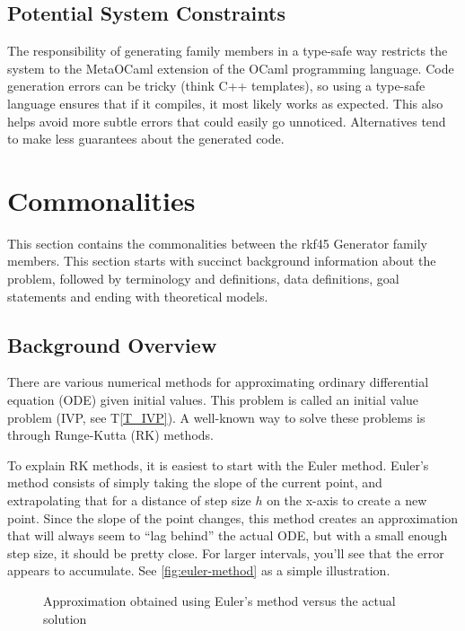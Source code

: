 \documentclass[12pt]{article}
\newcommand{\tref}[1]{T\ref{#1}}
\newcommand{\famname}{rkf45 Generator} %
\begin{document}
                          
\subsection{Potential System Constraints}

The responsibility of generating family members in a type-safe way restricts 
the system to the MetaOCaml extension of the OCaml programming language.
Code generation errors can be tricky (think C++ templates), so using a 
type-safe language ensures that if it compiles, it most likely works as 
expected.
This also helps avoid more subtle errors that could easily go unnoticed.
Alternatives tend to make less guarantees about the generated code.
\section{Commonalities}

This section contains the commonalities between the \famname{} family members. 
This section starts with succinct background information about the problem, 
followed by terminology and definitions, data definitions, goal statements and 
ending with theoretical models. 

\subsection{Background Overview} \label{Sec_Background}

There are various numerical methods for approximating ordinary differential 
equation (ODE) given initial values. This problem is called an initial value 
problem (IVP, see \tref{T_IVP}). A well-known way to solve these problems is 
through Runge-Kutta (RK) methods.%

To explain RK methods, it is easiest to start with the Euler method. Euler's 
method consists of simply taking the slope of the current point, and 
extrapolating that for a distance of step size $h$ on the x-axis to create a 
new point. Since the slope of the point changes, this method creates an 
approximation that will always seem to ``lag behind'' the actual ODE, but with 
a small enough step size, it should be pretty close. For larger intervals, 
you'll see that the error appears to accumulate. See
\autoref{fig:euler-method} as a simple illustration.

\begin{figure}[htb]
  \centering
  \def\svgwidth{0.5\textwidth}
  
  \caption{Approximation obtained using Euler's method versus the actual 
  solution}
  \label{fig:euler-method}
\end{figure}
\end{document}
